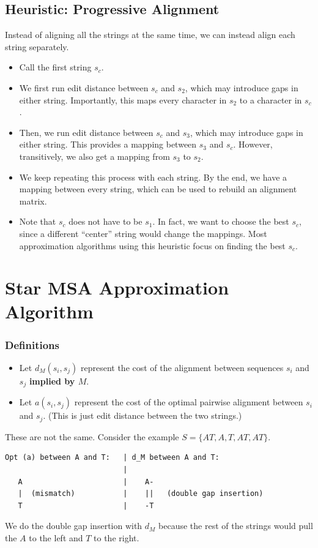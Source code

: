 \documentclass[10pt]{article}
\begin{document}
\subsection*{Heuristic: Progressive Alignment}
Instead of aligning all the strings at the same time, we can instead align each string separately.
\begin{itemize}
	\item Call the first string $s_c$.
	\item We first run edit distance between $s_c$ and $s_2$, which may introduce gaps in either string.  Importantly, this maps every character in $s_2$ to a character in $s_c$.
	\item Then, we run edit distance between $s_c$ and $s_3$, which may introduce gaps in either string.  This provides a mapping between $s_3$ and $s_c$.  However, transitively, we also get a mapping from $s_3$ to $s_2$.
	\item We keep repeating this process with each string.  By the end, we have a mapping between every string, which can be used to rebuild an alignment matrix.
	\item Note that $s_c$ does not have to be $s_1$.  In fact, we want to choose the best $s_c$, since a different ``center'' string would change the mappings.  Most approximation algorithms using this heuristic focus on finding the best $s_c$.
\end{itemize}

\section*{Star MSA Approximation Algorithm}
\subsubsection*{Definitions}
\begin{itemize}
	\item Let $d_M(s_i, s_j)$ represent the cost of the alignment between sequences $s_i$ and $s_j$ \textbf{implied by $M$}.
	\item Let $a(s_i, s_j)$ represent the cost of the optimal pairwise alignment between $s_i$ and $s_j$.  (This is just edit distance between the two strings.)
\end{itemize}
These are not the same.  Consider the example $S = \{AT, A, T, AT, AT\}$.
\begin{verbatim}
Opt (a) between A and T:   | d_M between A and T:
                           |   
   A                       |    A-
   |  (mismatch)           |    ||   (double gap insertion)
   T                       |    -T
\end{verbatim}
We do the double gap insertion with $d_M$ because the rest of the strings would pull the $A$ to the left and $T$ to the right.
\end{document}
